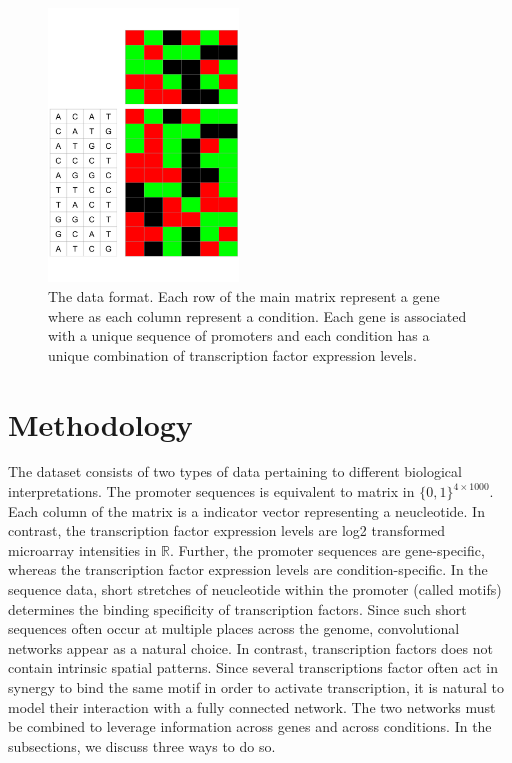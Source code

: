 \documentclass{article}
\begin{document}
\begin{figure}
\begin{center}
\includegraphics[width=0.45\textwidth]{fig/Dataset.png}
\end{center}
\caption{The data format. Each row of the main matrix represent a gene where as each column represent a condition. Each gene is associated with a unique sequence of promoters and each condition has a unique combination of transcription factor expression levels.}
\label{dataset}
\end{figure}

\section{Methodology}

The dataset consists of two types of data pertaining to different biological interpretations. The promoter sequences is equivalent to matrix in $\{0,1\}^{4 \times 1000}$. Each column of the matrix is a indicator vector representing a neucleotide. In contrast, the transcription factor expression levels are log2 transformed microarray intensities in $\mathbb{R}$. Further, the promoter sequences are gene-specific, whereas the transcription factor expression levels are condition-specific. In the sequence data, short stretches of neucleotide within the promoter (called motifs) determines the binding specificity of transcription factors. Since such short sequences often occur at multiple places across the genome, convolutional networks appear as a natural choice. In contrast, transcription factors does not contain intrinsic spatial patterns. Since several transcriptions factor often act in synergy to bind the same motif in order to activate transcription, it is natural to model their interaction with a fully connected network. The two networks must be combined to leverage information across genes and across conditions. In the subsections, we discuss three ways to do so.
\end{document}
